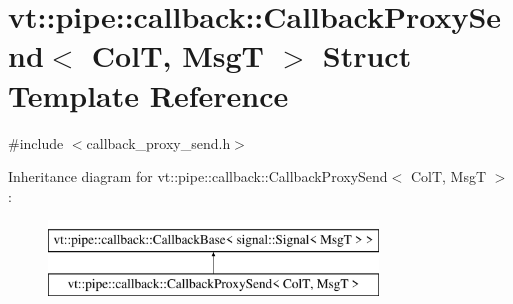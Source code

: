 \hypertarget{structvt_1_1pipe_1_1callback_1_1_callback_proxy_send}{}\section{vt\+:\+:pipe\+:\+:callback\+:\+:Callback\+Proxy\+Send$<$ ColT, MsgT $>$ Struct Template Reference}
\label{structvt_1_1pipe_1_1callback_1_1_callback_proxy_send}


{\ttfamily \#include $<$callback\+\_\+proxy\+\_\+send.\+h$>$}

Inheritance diagram for vt\+:\+:pipe\+:\+:callback\+:\+:Callback\+Proxy\+Send$<$ ColT, MsgT $>$\+:\begin{figure}[H]
\begin{center}
\leavevmode
\includegraphics[height=2.000000cm]{structvt_1_1pipe_1_1callback_1_1_callback_proxy_send}
\end{center}
\end{figure}
